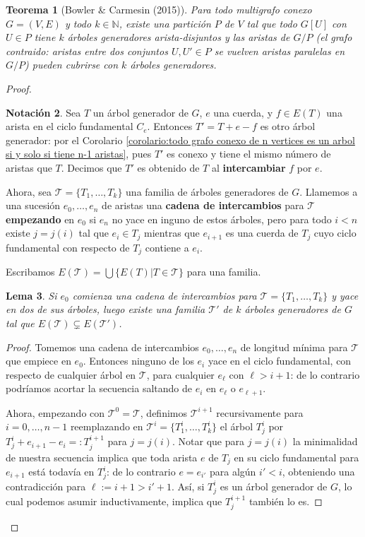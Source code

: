 \documentclass[12pt]{report}
\theoremstyle{plain}
\newtheorem{theorem}{Teorema}[section]
\newtheorem{lemma}[theorem]{Lema}
\theoremstyle{definition}
\newtheorem{notation}[theorem]{Notación}
\newcommand{\naturals}{\mathbb{N}}
\begin{document}
\begin{theorem}[Bowler \& Carmesin (2015)]\label{th:packing-covering theorem - Bowler - Carmesin - 2015}
Para todo multigrafo conexo $G = (V,E)$ y todo $k \in \naturals$, existe una partición $P$ de $V$ tal que todo $G[U]$ con $U \in P$ tiene $k$ árboles generadores arista-disjuntos y las aristas de $G/P$ (el grafo contraido: aristas entre dos conjuntos $U,U' \in P$ se vuelven aristas paralelas en $G/P$) pueden cubrirse con $k$ árboles generadores.
\end{theorem}
\begin{proof}
\begin{notation}
Sea $T$ un árbol generador de $G$, $e$ una cuerda, y $f \in E(T)$ una arista en el ciclo fundamental $C_e$. Entonces $T' = T + e - f$ es otro árbol generador: por el Corolario \ref{corolario:todo grafo conexo de n vertices es un arbol si y solo si tiene n-1 aristas}, pues $T'$ es conexo y tiene el mismo número de aristas que $T$. Decimos que $T'$ es obtenido de $T$ al \textbf{intercambiar} $f$ por $e$.

Ahora, sea $\mathcal{T} = \{T_1,\ldots, T_k\}$ una familia de árboles generadores de $G$. Llamemos a una sucesión $e_0, \ldots, e_n$ de aristas una \textbf{cadena de intercambios} para $\mathcal{T}$ \textbf{empezando} en $e_0$ si $e_n$ no yace en inguno de estos árboles, pero para todo $i < n$ existe $j = j(i)$ tal que $e_i \in T_j$ mientras que $e_{i+1}$ es una cuerda de $T_j$ cuyo ciclo fundamental con respecto de $T_j$ contiene a $e_i$.

Escribamos $E(\mathcal{T})  = \bigcup \{ E(T) | T \in \mathcal{T} \}$ para una familia.
\end{notation}

\begin{lemma}
Si $e_0$ comienza una cadena de intercambios para $\mathcal{T}= \{T_1,\ldots, T_k\}$ y yace en dos de sus árboles, luego existe una familia $\mathcal{T} '$ de $k$ árboles generadores de $G$ tal que $E(\mathcal{T}) \subsetneq E(\mathcal{T} ')$.
\end{lemma}
\begin{proof}
Tomemos una cadena de intercambios $e_0,\ldots, e_n$ de longitud mínima para $\mathcal T$ que empiece en $e_0$. Entonces ninguno de los $e_i$ yace en el ciclo fundamental, con respecto de cualquier árbol en $\mathcal T$, para cualquier $e_\ell$ con $\ell > i + 1$: de lo contrario podríamos acortar la secuencia saltando de $e_i$ en $e_\ell$ o $e_{\ell+1}$.

Ahora, empezando con $\mathcal T ^0 = \mathcal T$, definimos $\mathcal T^{i+1}$ recursivamente para $i = 0, \ldots, n-1$ reemplazando en $\mathcal T^i = \{ T_1^i , \ldots, T_k^i\}$ el árbol $T_j^i$ por $T_j^i + e_{i+1} - e_i =: T_j^{i+1}$ para $j = j(i)$. Notar que para $j = j(i)$ la minimalidad de nuestra secuencia implica que toda arista $e$ de $T_j$ en su ciclo fundamental para $e_{i+1}$ está todavía en $T_j^i$: de lo contrario $e = e_{i'}$ para algún $i' < i$, obteniendo una contradicción para $\ell := i+1 > i' + 1$. Así, si $T_j^i$ es un árbol generador de $G$, lo cual podemos asumir inductivamente, implica que $T_j^{i+1}$ también lo es.


\end{proof}
\end{proof}
\end{document}
